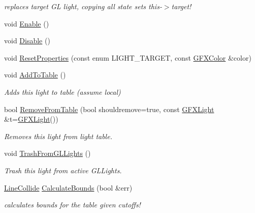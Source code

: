 \begin{DoxyCompactItemize}
\begin{DoxyCompactList}\small\item\em replaces target GL light, copying all state sets this-\/$>$target! \end{DoxyCompactList}\item 
void \hyperlink{classgfx__light_a98dd12bab9a5abd1e753cfe45bc691e5}{Enable} ()
\item 
void \hyperlink{classgfx__light_a6f2e3188d31ac410ed8bb9f359109ada}{Disable} ()
\item 
void \hyperlink{classgfx__light_ad2f21e62fda27aa966ead4cdf970b498}{Reset\+Properties} (const enum L\+I\+G\+H\+T\+\_\+\+T\+A\+R\+G\+ET, const \hyperlink{structGFXColor}{G\+F\+X\+Color} \&color)
\item 
void \hyperlink{classgfx__light_ab1082197235eca910a259c3862de4a91}{Add\+To\+Table} ()\hypertarget{classgfx__light_ab1082197235eca910a259c3862de4a91}{}\label{classgfx__light_ab1082197235eca910a259c3862de4a91}

\begin{DoxyCompactList}\small\item\em Adds this light to table (assume local) \end{DoxyCompactList}\item 
bool \hyperlink{classgfx__light_abe5840a659d06adf02edb7970595ca0f}{Remove\+From\+Table} (bool shouldremove=true, const \hyperlink{classGFXLight}{G\+F\+X\+Light} \&t=\hyperlink{classGFXLight}{G\+F\+X\+Light}())\hypertarget{classgfx__light_abe5840a659d06adf02edb7970595ca0f}{}\label{classgfx__light_abe5840a659d06adf02edb7970595ca0f}

\begin{DoxyCompactList}\small\item\em Removes this light from light table. \end{DoxyCompactList}\item 
void \hyperlink{classgfx__light_a089842c22a956701aace437146b3393b}{Trash\+From\+G\+L\+Lights} ()\hypertarget{classgfx__light_a089842c22a956701aace437146b3393b}{}\label{classgfx__light_a089842c22a956701aace437146b3393b}

\begin{DoxyCompactList}\small\item\em Trash this light from active G\+L\+Lights. \end{DoxyCompactList}\item 
\hyperlink{structLineCollide}{Line\+Collide} \hyperlink{classgfx__light_a5e722e1372b93fe2eee3c68bbf472fc0}{Calculate\+Bounds} (bool \&err)\hypertarget{classgfx__light_a5e722e1372b93fe2eee3c68bbf472fc0}{}\label{classgfx__light_a5e722e1372b93fe2eee3c68bbf472fc0}

\begin{DoxyCompactList}\small\item\em calculates bounds for the table given cutoffs! \end{DoxyCompactList}\end{DoxyCompactItemize}
